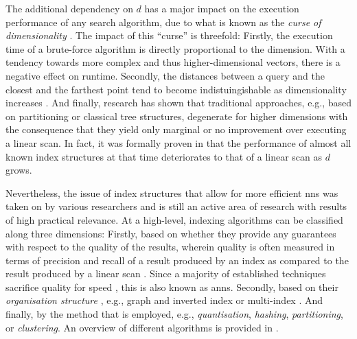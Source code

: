 The additional dependency on $d$ has a major impact on the execution performance of any search algorithm, due to what is known as the \emph{curse of dimensionality} \cite{Beyer:1999Nearest,Zezula:2006Similarity}. The impact of this ``curse'' is threefold: Firstly, the execution time of a brute-force algorithm is directly proportional to the dimension. With a tendency towards more complex and thus higher-dimensional vectors, there is a negative effect on runtime. Secondly, the distances between a query and the closest and the farthest point tend to become indistuingishable as dimensionality increases \cite{Beyer:1999Nearest}. And finally, research has shown that traditional approaches, e.g., based on partitioning or classical tree structures, degenerate for higher dimensions \cite{Indyk1998:Approximate,Weber:1998Va} with the consequence that they yield only marginal or no improvement over executing a linear scan. In fact, it was formally proven in \cite{Shaft:2006Theory} that the performance of almost all known index structures at that time deteriorates to that of a linear scan as $d$ grows.

Nevertheless, the issue of index structures that allow for more efficient \acrshort{nns} was taken on by various researchers and is still an active area of research with results of high practical relevance. At a high-level, indexing algorithms can be classified along three dimensions: Firstly, based on whether they provide any guarantees with respect to the quality of the results, wherein quality is often measured in terms of precision and recall of a result produced by an index as compared to the result produced by a linear scan \cite{Echihabi:2021High}. Since a majority of established techniques sacrifice quality for speed \cite{Siguroardottir:2005Quality}, this is also known as \acrfull{anns}. Secondly, based on their \emph{organisation structure} \cite{Shaft:2006Theory}, e.g., graph and inverted index \cite{Sivic:2003Video} or multi-index \cite{Babenko:2014Inverted}. And finally, by the method that is employed, e.g., \emph{quantisation}, \emph{hashing}, \emph{partitioning}, or \emph{clustering}. An overview of different algorithms is provided in .

